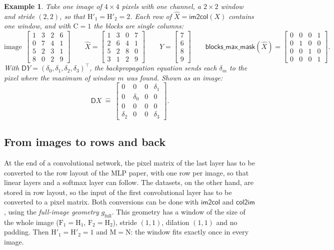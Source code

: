 \documentclass[twoside,11pt]{article}
\newtheorem{example}{Example}
\newcommand{\const}[1]{\ensuremath{\mathrm{#1}}} %
\newcommand{\func}[1]{\ensuremath{\textsf{#1}}}  %
\newcommand{\Gradient}{\textsf{D}}
\newcommand{\Hin}{\const{H}}         %
\newcommand{\Hout}{\const{H}'}       %
\newcommand{\Fs}{\const{F}}          %
\newcommand{\im}{\func{im2col}}
\newcommand{\ci}{\func{col2im}}
\newcommand{\bmask}{\func{blocks\_max\_mask}}
\begin{document}
\begin{example} \label{example:max-pooling}
Take one image of $4 \times 4$ pixels with one channel, a $2 \times 2$ window and stride $(2,2)$, so that $\Hout_1 = \Hout_2 = 2$.
Each row of $\hat X = \im(X)$ contains one window, and with $\const{C} = 1$ the blocks are single columns:
\[
\text{image}\ \
\left[\begin{array}{cc|cc}
1 & 3 & 2 & 6 \\
0 & 7 & 4 & 1 \\ \hline
5 & 2 & 3 & 1 \\
8 & 0 & 2 & 9
\end{array}\right]
\qquad
\hat X =
\begin{bmatrix}
1 & 3 & 0 & 7 \\
2 & 6 & 4 & 1 \\
5 & 2 & 8 & 0 \\
3 & 1 & 2 & 9
\end{bmatrix}
\qquad
Y =
\begin{bmatrix} 7 \\ 6 \\ 8 \\ 9 \end{bmatrix}
\qquad
\bmask(\hat X) =
\begin{bmatrix}
0 & 0 & 0 & 1 \\
0 & 1 & 0 & 0 \\
0 & 0 & 1 & 0 \\
0 & 0 & 0 & 1
\end{bmatrix}.
\]
With $\Gradient Y = (\delta_0, \delta_1, \delta_2, \delta_3)^\top$, the backpropagation equation sends each $\delta_m$ to the pixel where the maximum of window $m$ was found. Shown as an image:
\[
\Gradient X \ \hat{=} \
\begin{bmatrix}
0 & 0 & 0 & \delta_1 \\
0 & \delta_0 & 0 & 0 \\
0 & 0 & 0 & 0 \\
\delta_2 & 0 & 0 & \delta_3
\end{bmatrix}.
\]
\end{example}

\subsection{From images to rows and back} \label{section:flatten}
At the end of a convolutional network, the pixel matrix of the last layer has to be converted to the row layout of the MLP paper, with one row per image, so that linear layers and a softmax layer can follow.
The datasets, on the other hand, are stored in row layout, so the input of the first convolutional layer has to be converted to a pixel matrix.
Both conversions can be done with \im{} and \ci, using the \emph{full-image geometry} $g_\text{full}$.
This geometry has a window of the size of the whole image ($\Fs_1 = \Hin_1$, $\Fs_2 = \Hin_2$), stride $(1,1)$, dilation $(1,1)$ and no padding.
Then $\Hout_1 = \Hout_2 = 1$ and $\const{M} = \const{N}$: the window fits exactly once in every image.
\end{document}
